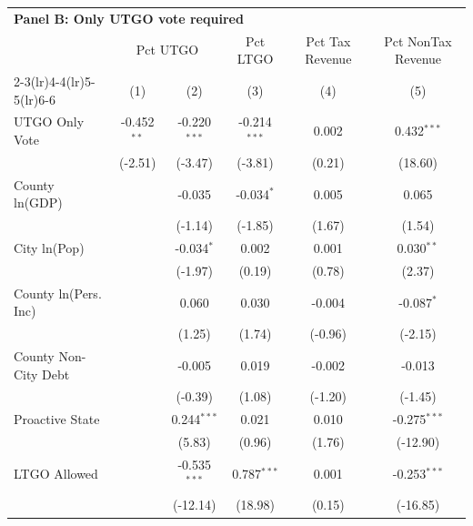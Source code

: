 \begingroup
\centering
\begin{tabular*}{\textwidth}{@{\extracolsep{\fill}}lccccc}
\multicolumn{5}{l}{\textbf{Panel B: Only UTGO vote required}}\\

\addlinespace
   \toprule
    & \multicolumn{2}{c}{Pct UTGO} & Pct LTGO & Pct Tax Revenue & Pct NonTax Revenue\\
   \cmidrule(lr){2-3}\cmidrule(lr){4-4}\cmidrule(lr){5-5}\cmidrule(lr){6-6}
                        & (1)           & (2)            & (3)            & (4)         & (5)\\  
   \midrule 
   UTGO Only Vote       & -0.452$^{**}$ & -0.220$^{***}$ & -0.214$^{***}$ & 0.002       & 0.432$^{***}$\\   
                        & (-2.51)      & (-3.47)       & (-3.81)       & (0.21)     & (18.60)\\   
   County ln(GDP)       &               & -0.035         & -0.034$^{*}$   & 0.005       & 0.065\\   
                        &               & (-1.14)       & (-1.85)       & (1.67)     & (1.54)\\   
   City ln(Pop)         &               & -0.034$^{*}$   & 0.002          & 0.001       & 0.030$^{**}$\\   
                        &               & (-1.97)       & (0.19)        & (0.78)     & (2.37)\\   
   County ln(Pers. Inc) &               & 0.060          & 0.030          & -0.004      & -0.087$^{*}$\\   
                        &               & (1.25)        & (1.74)        & (-0.96)    & (-2.15)\\   
   County Non-City Debt &               & -0.005         & 0.019          & -0.002      & -0.013\\   
                        &               & (-0.39)       & (1.08)        & (-1.20)    & (-1.45)\\   
   Proactive State      &               & 0.244$^{***}$  & 0.021          & 0.010       & -0.275$^{***}$\\   
                        &               & (5.83)        & (0.96)        & (1.76)     & (-12.90)\\   
   LTGO Allowed         &               & -0.535$^{***}$ & 0.787$^{***}$  & 0.001       & -0.253$^{***}$\\   
                        &               & (-12.14)      & (18.98)       & (0.15)     & (-16.85)\\   

\end{tabular*}
